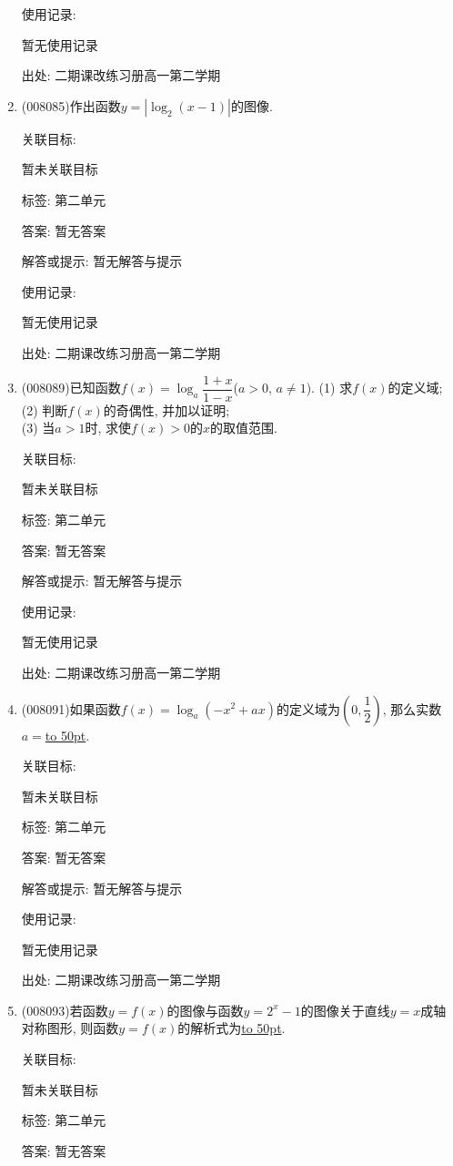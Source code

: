 \documentclass[10pt,a4paper]{article}
\newcommand{\blank}[1]{\underline{\hbox to #1pt{}}}
\begin{document}
\begin{enumerate}[1.]
使用记录:

暂无使用记录


出处: 二期课改练习册高一第二学期
\item { (008085)}作出函数$y=|\log _2(x-1)|$的图像.


关联目标:

暂未关联目标



标签: 第二单元

答案: 暂无答案

解答或提示: 暂无解答与提示

使用记录:

暂无使用记录


出处: 二期课改练习册高一第二学期
\item { (008089)}已知函数$f(x)=\log _a\dfrac{1+x}{1-x}$($a>0$, $a\ne 1$).
(1) 求$f(x)$的定义域;\\
(2) 判断$f(x)$的奇偶性, 并加以证明;\\
(3) 当$a>1$时, 求使$f(x)>0$的$x$的取值范围.


关联目标:

暂未关联目标



标签: 第二单元

答案: 暂无答案

解答或提示: 暂无解答与提示

使用记录:

暂无使用记录


出处: 二期课改练习册高一第二学期
\item { (008091)}如果函数$f(x)=\log _a(-x^2+ax)$的定义域为$(0,\dfrac 12)$, 那么实数$a=$\blank{50}.


关联目标:

暂未关联目标



标签: 第二单元

答案: 暂无答案

解答或提示: 暂无解答与提示

使用记录:

暂无使用记录


出处: 二期课改练习册高一第二学期
\item { (008093)}若函数$y=f(x)$的图像与函数$y=2^x-1$的图像关于直线$y=x$成轴对称图形, 则函数$y=f(x)$的解析式为\blank{50}.


关联目标:

暂未关联目标



标签: 第二单元

答案: 暂无答案


\end{enumerate}
\end{document}

